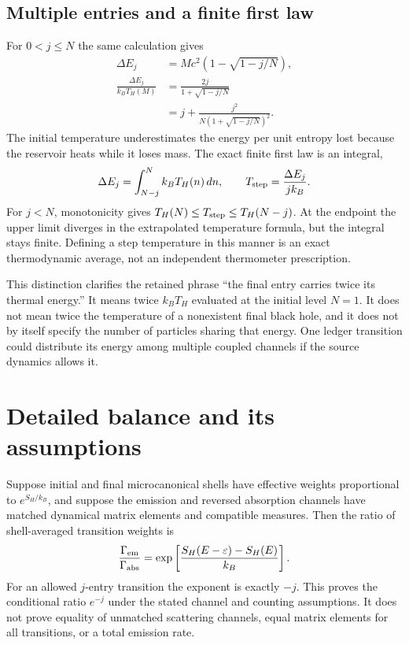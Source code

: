 \subsection{Multiple entries and a finite first law}
For $0<j\le N$ the same calculation gives
\begin{equation}
 \begin{aligned}
 \Delta E_j&=Mc^2\left(1-\sqrt{1-j/N}\right),\\
 \frac{\Delta E_j}{k_BT_H(M)}
 &=\frac{2j}{1+\sqrt{1-j/N}}
\\&=j+\frac{j^2}{N(1+\sqrt{1-j/N})^2}.
 \end{aligned}
 \label{c7:jstep}
\end{equation}
The initial temperature underestimates the energy per unit entropy lost because the reservoir heats while it loses mass. The exact finite first law is an integral,
\begin{equation}
 \Delta E_j=\int_{N-j}^{N}k_BT_H(n)\,dn,
 \qquad T_{\rm step}=\frac{\Delta E_j}{jk_B}.
 \label{c7:step-temperature}
\end{equation}
For $j<N$, monotonicity gives $T_H(N)\le T_{\rm step}\le T_H(N-j)$. At the endpoint the upper limit diverges in the extrapolated temperature formula, but the integral stays finite. Defining a step temperature in this manner is an exact thermodynamic average, not an independent thermometer prescription.

This distinction clarifies the retained phrase ``the final entry carries twice its thermal energy.'' It means twice $k_BT_H$ evaluated at the initial level $N=1$. It does not mean twice the temperature of a nonexistent final black hole, and it does not by itself specify the number of particles sharing that energy. One ledger transition could distribute its energy among multiple coupled channels if the source dynamics allows it.

\section{Detailed balance and its assumptions}
Suppose initial and final microcanonical shells have effective weights proportional to $e^{S_H/k_B}$, and suppose the emission and reversed absorption channels have matched dynamical matrix elements and compatible measures. Then the ratio of shell-averaged transition weights is
\begin{equation}
 \frac{\Gamma_{\rm em}}{\Gamma_{\rm abs}}
 =\exp\left[\frac{S_H(E-\varepsilon)-S_H(E)}{k_B}\right].
 \label{c7:balance}
\end{equation}
For an allowed $j$-entry transition the exponent is exactly $-j$. This proves the conditional ratio $e^{-j}$ under the stated channel and counting assumptions. It does not prove equality of unmatched scattering channels, equal matrix elements for all transitions, or a total emission rate.

